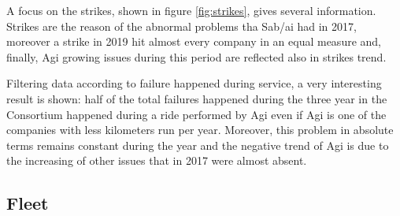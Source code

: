 \newpage

\begin{landscape}
\thispagestyle{empty}

\end{landscape}
\newpage

A focus on the strikes, shown in figure \ref{fig:strikes}, gives several information. Strikes are the reason of the abnormal problems tha Sab/ai had in 2017, moreover a strike in 2019 hit almost every company in an equal measure and, finally, Agi growing issues during this period are reflected also in strikes trend. 

Filtering data according to failure happened during service, a very interesting result is shown: half of the total failures happened during the three year in the Consortium happened during a ride performed by Agi even if Agi is one of the companies with less kilometers run per year. Moreover, this problem in absolute terms remains constant during the year and the negative trend of Agi is due to the increasing of other issues that in 2017 were almost absent.

\newpage
\begin{landscape}
\thispagestyle{empty}

\end{landscape}
\newpage

\subsection{Fleet}


